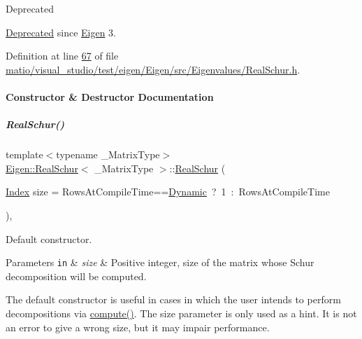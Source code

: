 \begin{DoxyRefDesc}{Deprecated}
\item[\hyperlink{deprecated__deprecated000066}{Deprecated}]since \hyperlink{namespace_eigen}{Eigen} 3. \end{DoxyRefDesc}


Definition at line \hyperlink{matio_2visual__studio_2test_2eigen_2_eigen_2src_2_eigenvalues_2_real_schur_8h_source_l00067}{67} of file \hyperlink{matio_2visual__studio_2test_2eigen_2_eigen_2src_2_eigenvalues_2_real_schur_8h_source}{matio/visual\+\_\+studio/test/eigen/\+Eigen/src/\+Eigenvalues/\+Real\+Schur.\+h}.



\paragraph{Constructor \& Destructor Documentation}
\mbox{\label{group___eigenvalues___module_a826c83e2f1d4c8332606a14ea121ff5f}} 
\subparagraph{\texorpdfstring{Real\+Schur()}{RealSchur()}\hspace{0.1cm}{\footnotesize\ttfamily [1/4]}}
{\footnotesize\ttfamily template$<$typename \+\_\+\+Matrix\+Type$>$ \\
\hyperlink{group___eigenvalues___module_class_eigen_1_1_real_schur}{Eigen\+::\+Real\+Schur}$<$ \+\_\+\+Matrix\+Type $>$\+::\hyperlink{group___eigenvalues___module_class_eigen_1_1_real_schur}{Real\+Schur} (\begin{DoxyParamCaption}\item[{\hyperlink{group___eigenvalues___module_a8bd4653e2d9569a44ecc95e746422d3f}{Index}}]{size = {\ttfamily RowsAtCompileTime==\hyperlink{namespace_eigen_ad81fa7195215a0ce30017dfac309f0b2}{Dynamic}~?~1~\+:~RowsAtCompileTime} }\end{DoxyParamCaption})\hspace{0.3cm}{\ttfamily [inline]}, {\ttfamily [explicit]}}



Default constructor. 


\begin{DoxyParams}[1]{Parameters}
\mbox{\tt in}  & {\em size} & Positive integer, size of the matrix whose Schur decomposition will be computed.\\
\hline
\end{DoxyParams}
The default constructor is useful in cases in which the user intends to perform decompositions via \hyperlink{group___eigenvalues___module_a60caf9ffad11d728ea458c4dd36d0a98}{compute()}. The {\ttfamily size} parameter is only used as a hint. It is not an error to give a wrong {\ttfamily size}, but it may impair performance.

